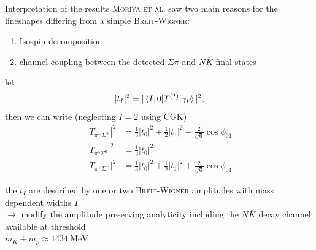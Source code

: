 \documentclass[11pt,aspectratio=1610,dvipsnames]{beamer}
\begin{document}
\begin{frame}{Interpretation of the results}
	\textsc{Moriya et al.} saw two main reasons for the lineshapes differing from a simple \textsc{Breit-Wigner}:
	\begin{enumerate}
		\item Isospin decomposition
		\item channel coupling between the detected $\Sigma\pi$ and $N\overline{K}$ final states
	\end{enumerate}
\begin{minipage}{.54\linewidth}
	\begin{tcolorbox}[colback=black!10,colframe=gray!20!black,title=Isospin decomposition] 
		let $$|t_I|^2=|\braket{I,0|T^{(I)}|\gamma p}|^2,$$
		then we can write (neglecting $I=2$ using CGK)
		\vspace{-0.5cm}
		\begin{align*}
			|T_{\pi^-\Sigma^+}|^2&=\frac{1}{3}|t_0|^2+\frac{1}{2}|t_1|^2-\frac{2}{\sqrt{6}}\cos\phi_{01}\\
			|T_{\pi^0\Sigma^0}|^2&=\frac{1}{3}|t_0|^2\\
			|T_{\pi^+\Sigma^-}|^2&=\frac{1}{3}|t_0|^2+\frac{1}{2}|t_1|^2+\frac{2}{\sqrt{6}}\cos\phi_{01}
		\end{align*}
	\end{tcolorbox}
\end{minipage}
\begin{minipage}{.45\linewidth}
	\begin{tcolorbox}[colback=black!10,colframe=gray!20!black,title=Channel coupling]
		the $t_I$ are described by one or two \textsc{Breit-Wigner} amplitudes with mass dependent widths $\Gamma$ \\
		$\to$ modify the amplitude preserving analyticity \citet{flatte} including the $N\overline{K}$ decay channel available at threshold\\ $m_K+m_p\approx\SI{1434}{\mega\eV}$
		\vspace{.5cm}
	\end{tcolorbox}
\end{minipage}

\end{frame}
\end{document}
